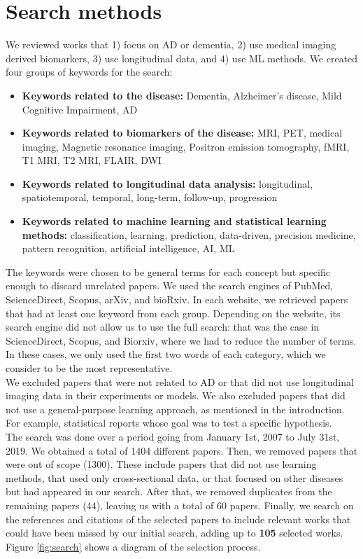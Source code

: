 \section{Search methods}
\label{sec:search}

We reviewed works that 1) focus on AD or dementia, 2) use medical imaging derived biomarkers, 3) use longitudinal data, and 4) use ML methods. We created four groups of keywords for the search:

\begin{itemize}\itemsep5pt
  \item \textbf{Keywords related to the disease:} Dementia, Alzheimer’s disease, Mild Cognitive Impairment, AD
  \item \textbf{Keywords related to biomarkers of the disease:} MRI, PET, medical imaging, Magnetic resonance imaging, Positron emission tomography, fMRI, T1 MRI, T2 MRI, FLAIR, DWI
  \item \textbf{Keywords related to longitudinal data analysis:} longitudinal, spatiotemporal, temporal, long-term, follow-up, progression
  \item \textbf{Keywords related to machine learning and statistical learning methods:} classification, learning, prediction, data-driven, precision medicine, pattern recognition, artificial intelligence, AI, ML
\end{itemize}

The keywords were chosen to be general terms for each concept but specific enough to discard unrelated papers. We used the search engines of PubMed, ScienceDirect, Scopus, arXiv, and bioRxiv. In each website, we retrieved papers that had at least one keyword from each group. Depending on the website, its search engine did not allow us to use the full search: that was the case in ScienceDirect, Scopus, and Biorxiv, where we had to reduce the number of terms. In these cases, we only used the first two words of each category, which we consider to be the most representative. \\

We excluded papers that were not related to AD or that did not use longitudinal imaging data in their experiments or models. We also excluded papers that did not use a general-purpose learning approach, as mentioned in the introduction. For example, statistical reports whose goal was to test a specific hypothesis. \\

The search was done over a period going from January 1st, 2007 to July 31st, 2019. We obtained a total of 1404 different papers. Then, we removed papers that were out of scope (1300). These include papers that did not use learning methods, that used only cross-sectional data, or that focused on other diseases but had appeared in our search. After that, we removed duplicates from the remaining papers (44), leaving us with a total of 60 papers. Finally, we search on the references and citations of the selected papers to include relevant works that could have been missed by our initial search, adding up to \textbf{105} selected works. Figure \ref{fig:search} shows a diagram of the selection process.

